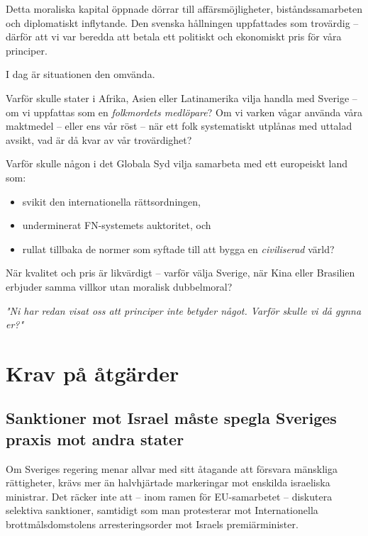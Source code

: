 Detta moraliska kapital öppnade dörrar till affärsmöjligheter, biståndssamarbeten och diplomatiskt inflytande. Den svenska hållningen uppfattades som trovärdig – därför att vi var beredda att betala ett politiskt och ekonomiskt pris för våra principer.

I dag är situationen den omvända.

Varför skulle stater i Afrika, Asien eller Latinamerika vilja handla med Sverige – om vi uppfattas som en \textit{folkmordets medlöpare}?  
Om vi varken vågar använda våra maktmedel – eller ens vår röst – när ett folk systematiskt utplånas med uttalad avsikt, vad är då kvar av vår trovärdighet?

Varför skulle någon i det Globala Syd vilja samarbeta med ett europeiskt land som:

\begin{itemize}
  \item svikit den internationella rättsordningen,
  \item underminerat FN-systemets auktoritet, och
  \item rullat tillbaka de normer som syftade till att bygga en \textit{civiliserad} värld?
\end{itemize}

När kvalitet och pris är likvärdigt – varför välja Sverige, när Kina eller Brasilien erbjuder samma villkor utan moralisk dubbelmoral?

\textit{"Ni har redan visat oss att principer inte betyder något. Varför skulle vi då gynna er?"}



\section*{Krav på åtgärder}
\subsection*{Sanktioner mot Israel måste spegla Sveriges praxis mot andra stater}

Om Sveriges regering menar allvar med sitt åtagande att försvara mänskliga rättigheter, krävs mer än halvhjärtade markeringar mot enskilda israeliska ministrar. Det räcker inte att – inom ramen för EU-samarbetet – diskutera selektiva sanktioner, samtidigt som man protesterar mot Internationella brottmålsdomstolens arresteringsorder mot Israels premiärminister.

